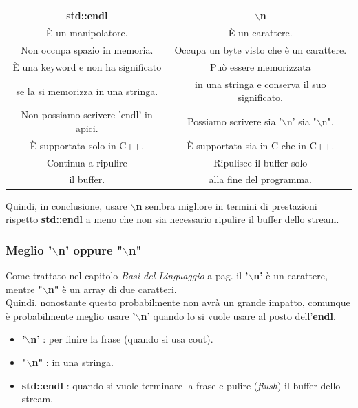 \begin{tabular}{|c|c|}
	\hline
	\textbf{std::endl} & \textbf{\small $\backslash$n} \\
	\hline
	\textsf{\small È un manipolatore.} & \textsf{\small È un carattere.} \\
	\hline
	\textsf{\small Non occupa spazio in memoria.} & \textsf{\small Occupa un byte visto che è un carattere.} \\
	\hline
	\textsf{\small È una keyword e non ha significato } & \textsf{\small Può essere memorizzata } \\
	\textsf{\small se la si memorizza in una stringa.} & \textsf{\small in una stringa e conserva il suo significato.} \\
	\hline
	\textsf{\small Non possiamo scrivere 'endl' in apici.} & \textsf{\small Possiamo scrivere sia '$\backslash$n' sia "$\backslash$n".} \\
	\hline
	\textsf{\small È supportata solo in C++.} & \textsf{\small È supportata sia in C che in C++.} \\
	\hline
	\textsf{\small Continua a ripulire } & \textsf{\small Ripulisce il buffer solo } \\
	\textsf{\small il buffer.} & \textsf{\small alla fine del programma.} \\
	\hline
\end{tabular}

\textsf{\small Quindi, in conclusione, usare \textbf{$\backslash$n} sembra migliore in termini di prestazioni rispetto \textbf{std::endl} a meno che non sia necessario ripulire il buffer dello stream.}

\subsubsection{Meglio '$\backslash$n' oppure "$\backslash$n"}

\textsf{\small Come trattato nel capitolo \emph{Basi del Linguaggio} a pag.\textbf{\pageref{newline_apici_o_virgolette}} il \textbf{'$\backslash$n'} è un carattere, mentre \textbf{"$\backslash$n"} è un array di due caratteri. } \\

\textsf{\small Quindi, nonostante questo probabilmente non avrà un grande impatto, comunque è probabilmente meglio usare \textbf{'$\backslash$n'} quando lo si vuole usare al posto dell'\textbf{endl}.} \\

\begin{itemize}
	\item \textsf{\small \textbf{'$\backslash$n'} : per finire la frase (quando si usa cout).}
	\item \textsf{\small \textbf{"$\backslash$n"} : in una stringa.}
	\item \textsf{\small \textbf{std::endl} : quando si vuole terminare la frase e pulire (\emph{flush}) il buffer dello stream. }
\end{itemize}

